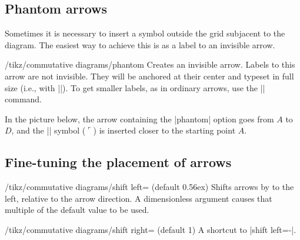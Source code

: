 \documentclass[a4paper]{ltxdoc}
\begin{document}
\subsection{Phantom arrows}
\label{sec:phantom-arrows}

Sometimes it is necessary to insert a symbol outside the grid
subjacent to the diagram.  The easiest way to achieve this is as a
label to an invisible arrow.

\begin{stylekey}{/tikz/commutative diagrams/phantom}
  Creates an invisible arrow.  Labels to this arrow are not invisible.
  They will be anchored at their center and typeset in full size
  (i.e., with |\textstyle|).  To get smaller labels, as in ordinary
  arrows, use the |\scriptstyle| command.
\end{stylekey}

In the picture below, the arrow containing the |phantom| option goes from
$A$ to $D$, and the |\ulcorner| symbol ($\ulcorner$) is inserted
closer to the starting point $A$.
\begin{codeexample}[]
\end{codeexample}

\subsection{Fine-tuning the placement of arrows}
\label{sec:fine-tuning-arrows}

\begin{key}{/tikz/commutative diagrams/shift left=
    (default 0.56ex)}
  Shifts arrows by  to the left, relative to the arrow
  direction.  A dimensionless argument causes that multiple of the
  default value to be used.
\end{key}

\begin{key}{/tikz/commutative diagrams/shift right=
    (default 1)}
  A shortcut to |shift left=-|.
\end{key}

\begin{codeexample}[]
\end{codeexample}
\end{document}
